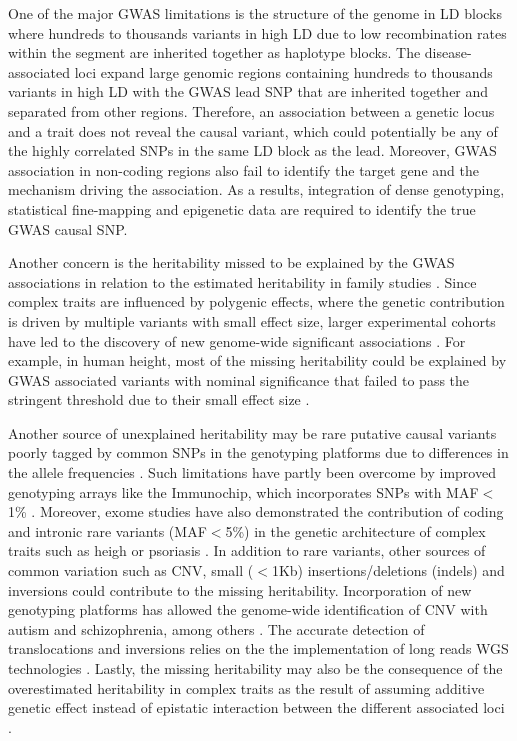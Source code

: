 One of the major GWAS limitations is the structure of the genome in LD blocks where hundreds to thousands variants in high LD due to low recombination rates within the segment are inherited together as haplotype blocks. The disease-associated loci expand large genomic regions containing hundreds to thousands variants in high LD with the GWAS lead SNP that are inherited together and separated from other regions. Therefore, an association between a genetic locus and a trait does not reveal the causal variant, which could potentially be any of the highly correlated SNPs in the same LD block as the lead. Moreover, GWAS association in non-coding regions also fail to identify the target gene and the mechanism driving the association. As a results, integration of dense genotyping, statistical fine-mapping and epigenetic data are required to identify the true GWAS causal SNP.

Another concern is the heritability missed to be explained by the GWAS associations in relation to the estimated heritability in family studies \parencite{Ku2010, Yang2010}. Since complex traits are influenced by polygenic effects, where the genetic contribution is driven by multiple variants with small effect size, larger experimental cohorts have led to the discovery of new genome-wide significant associations \parencite{Visscher2017}. For example, in human height, most of the missing heritability could be explained by GWAS associated variants with nominal significance that failed to pass the stringent threshold due to their small effect size \parencite{Yang2010}. 

Another source of unexplained heritability may be rare putative causal variants poorly tagged by common SNPs in the genotyping platforms due to differences in the allele frequencies \parencite{Wray2005}. Such limitations have partly been overcome by improved genotyping arrays like the Immunochip, which incorporates SNPs with MAF${<}$1\% \parencite{Cortes2011}. Moreover, exome studies have also demonstrated the contribution of coding and intronic rare variants (MAF${<}$5\%) in the genetic architecture of complex traits such as heigh or psoriasis \parencite{ Marouli2017, Dand2017}. In addition to rare variants, other sources of common variation such as CNV, small ($<$1Kb) insertions/deletions (indels) and inversions could contribute to the missing heritability. Incorporation of new genotyping platforms has allowed the genome-wide identification of CNV with autism and schizophrenia, among others \parencite{Glessner2009,Marshall2017}. The accurate detection of translocations and inversions relies on the the implementation of long reads WGS technologies \parencite{Visscher2017}. Lastly, the missing heritability may also be the consequence of the overestimated heritability in complex traits as the result of assuming additive genetic effect instead of epistatic interaction between the different associated loci \parencite{Zuk2012}. 




